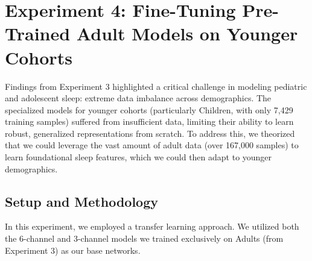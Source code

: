 \begin{table}[ht]
\centering
\caption{\textbf{Age-Specific Model Performance.} This table displays the evaluation metrics for networks trained exclusively on isolated demographic cohorts. It highlights the significant accuracy gains for teenagers, as well as the extreme vulnerability of the children model which we trained on a much smaller dataset when we subjected it to simulated sensor loss.} \label{tab:age_specific_results}
\end{table}

\FloatBarrier
\section{Experiment 4: Fine-Tuning Pre-Trained Adult Models on Younger Cohorts}

Findings from Experiment 3 highlighted a critical challenge in modeling pediatric and adolescent sleep: extreme data imbalance across demographics. The specialized models for younger cohorts (particularly Children, with only 7,429 training samples) suffered from insufficient data, limiting their ability to learn robust, generalized representations from scratch. To address this, we theorized that we could leverage the vast amount of adult data (over 167,000 samples) to learn foundational sleep features, which we could then adapt to younger demographics.

\subsection{Setup and Methodology}
In this experiment, we employed a transfer learning approach. We utilized both the 6-channel and 3-channel models we trained exclusively on Adults (from Experiment 3) as our base networks. 

